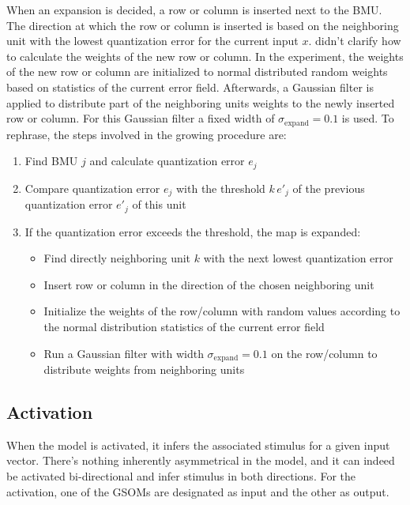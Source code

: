 \documentclass[twocolumn]{article}
\begin{document}
When an expansion is decided, a row or column is inserted next to the BMU. The direction at which the row or column is inserted is based on the neighboring unit with the lowest quantization error for the current input $x$. \textcite{gliozzi_visual_2018} didn't clarify how to calculate the weights of the new row or column. In the experiment, the weights of the new row or column are initialized to normal distributed random weights based on statistics of the current error field. Afterwards, a Gaussian filter is applied to distribute part of the neighboring units weights to the newly inserted row or column. For this Gaussian filter a fixed width of $\sigma_{\textrm{expand}} = 0.1$ is used. To rephrase, the steps involved in the growing procedure are:
\begin{enumerate}
    \item
        Find BMU $j$ and calculate quantization error $e_j$
    \item
        Compare quantization error $e_j$ with the threshold $k \, e'_j$ of the previous quantization error $e'_j$ of this unit
    \item
        If the quantization error exceeds the threshold, the map is expanded:
        \begin{itemize}
            \item
                Find directly neighboring unit $k$ with the next lowest quantization error
            \item
                Insert row or column in the direction of the chosen neighboring unit
            \item
                Initialize the weights of the row/column with random values according to the normal distribution statistics of the current error field
            \item
                Run a Gaussian filter with width $\sigma_{\textrm{expand}} = 0.1$ on the row/column to distribute weights from neighboring units
        \end{itemize}
\end{enumerate}

\subsection{Activation} \label{sub:activation}
When the model is activated, it infers the associated stimulus for a given input vector. There's nothing inherently asymmetrical in the model, and it can indeed be activated bi-directional and infer stimulus in both directions. For the activation, one of the GSOMs are designated as input and the other as output.
\end{document}
